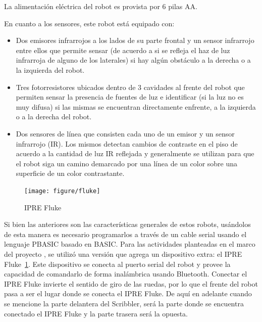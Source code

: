 La alimentación eléctrica del robot es provista por 6 pilas AA.

En cuanto a los sensores, este robot está equipado con:
\begin{itemize}
    \item Dos emisores infrarrojos a los lados de su parte frontal y un
        sensor infrarrojo entre ellos que permite sensar (de acuerdo a si se
        refleja el haz de luz infrarroja de alguno de los laterales) si
        hay algún obstáculo a la derecha o a la izquierda del robot.
    \item Tres fotorresistores ubicados dentro de 3 cavidades al frente del
        robot que permiten sensar la presencia de fuentes de luz e
        identificar (si la luz no es muy difusa) si las mismas se encuentran
        directamente enfrente, a la izquierda o a la derecha del robot.
    \item Dos sensores de línea que consisten cada uno de un emisor
        y un sensor infrarrojo (IR). Los mismos detectan cambios de contraste
        en el piso de acuerdo a la cantidad de luz IR reflejada y generalmente
        se utilizan para que el robot siga un camino demarcado por una línea
        de un color sobre una superficie de un color contrastante.
\end{itemize}

\begin{figure}
    \texttt{[image: figure/fluke]}
    \caption{IPRE Fluke}
    \label{fig:foto_fluke}
\end{figure}

Si bien las anteriores son las características generales de estos robots, usándolos
de esta manera es necesario programarlos a través de un cable serial usando el
lenguaje PBASIC basado en BASIC. Para las actividades planteadas en el marco del
proyecto \proyecto{}, se utilizó  una versión
que agrega un dispositivo extra: el IPRE Fluke~\ref{fig:foto_fluke}.
Este dispositivo se conecta al puerto
serial del robot y provee la capacidad de comandarlo de forma inalámbrica
usando Bluetooth.  Conectar el
IPRE Fluke invierte el sentido de giro de las ruedas, por lo que el frente
del robot pasa a ser el lugar donde se conecta el IPRE Fluke. De aquí
en adelante cuando se mencione la parte delantera del Scribbler, será la
parte donde se encuentra conectado el IPRE Fluke y la parte trasera será la
opuesta.

